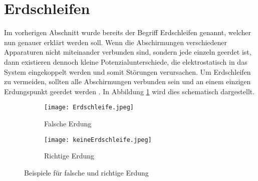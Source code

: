 \section{Erdschleifen}
Im vorherigen Abschnitt wurde bereits der Begriff Erdschleifen genannt, welcher nun genauer erklärt werden soll. Wenn die Abschirmungen verschiedener Apparaturen nicht miteinander verbunden sind, sondern jede einzeln geerdet ist, dann existieren dennoch kleine Potenzialunterschiede, die elektrostatisch in das System eingekoppelt werden und somit Störungen verursachen. Um Erdschleifen zu vermeiden, sollten alle Abschirmungen verbunden sein und an einem einzigen Erdungspunkt geerdet werden \citep{VA}. In Abbildung \ref{fig:Erdschleife} wird dies schematisch dargestellt.
\begin{figure}[h]
    \centering
    \begin{subfigure}{0.45\textwidth}
        \centering
        \texttt{[image: Erdschleife.jpeg]}
        \caption{Falsche Erdung \citep{VA}}
    \end{subfigure}
    \hfill 
    \begin{subfigure}{0.45\textwidth}
        \centering
        \texttt{[image: keineErdschleife.jpeg]}
        \caption{Richtige Erdung \citep{VA}}
    \end{subfigure}
    \caption{Beispiele für falsche und richtige Erdung}
    \label{fig:Erdschleife}
\end{figure}